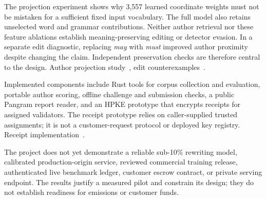 The projection experiment shows why 3,557 learned coordinate weights
must not be mistaken for a sufficient fixed input vocabulary. The full
model also retains unselected word and grammar contributions. Neither
author retrieval nor these feature ablations establish
meaning-preserving editing or detector evasion. In a separate edit
diagnostic, replacing \emph{may} with \emph{must} improved author
proximity despite changing the claim. Independent preservation checks
are therefore central to the design.
Author projection study~\cite{projection},
edit counterexamples~\cite{editcounterexamples}.

Implemented components include Rust tools for corpus collection and
evaluation, portable author scoring, offline challenge and submission
checks, a public Pangram report reader, and an HPKE prototype that
encrypts receipts for assigned validators. The receipt prototype relies on caller-supplied
trusted assignments; it is not a customer-request protocol or deployed
key registry.
Receipt implementation~\cite{receipts}.

The project does not yet demonstrate a reliable sub-10\% rewriting
model, calibrated production-origin service, reviewed commercial
training release, authenticated live benchmark ledger, customer escrow
contract, or private serving endpoint. The results justify a measured
pilot and constrain its design; they do not establish readiness for
emissions or customer funds.
